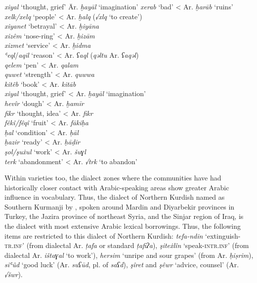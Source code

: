 \documentclass[output=paper]{langsci/langscibook}
\begin{document}
\ea
\begin{tabbing}
\textit{xiyal} ‘thought, grief’ \hspace{1em} \= Ar. \textit{ḫayāl} ‘imagination’\kill
\textit{xerab} ‘bad’     \> < Ar. \textit{ḫarāb} ‘ruins’\\
\textit{xelk/xelq} ‘people’  \> < Ar. \textit{ḫalq} (\textit{√xlq} ‘to create’)\\
\textit{xiyanet} ‘betrayal’  \> < Ar. \textit{ḫiyāna} \\
\textit{xizêm} ‘nose-ring’  \> < Ar. \textit{ḫizām}\\
\textit{xizmet} ‘service’  \> < Ar. \textit{ḫidma} \\
\textit{ʿeql}/\textit{aqil} ‘reason’  \> < Ar. \textit{ʕaql} (\textit{qəltu} Ar. \textit{ʕaqəl})\\
\textit{qelem} ‘pen’    \> < Ar. \textit{qalam}\\
\textit{quwet} ‘strength’  \> < Ar. \textit{quwwa}\\
\textit{kitêb} ‘book’    \> < Ar. \textit{kitāb}\\
\textit{xiyal} ‘thought, grief’  \> < Ar. \textit{ḫayāl} ‘imagination’\\
\textit{hevîr} ‘dough’    \> < Ar. \textit{ḫamīr} \\
\textit{fikr} ‘thought, idea’  \> < Ar. \textit{fikr}\\
\textit{fêkî/fêqî} ‘fruit’  \> < Ar. \textit{fākiḥa}\\
\textit{ḥal} ‘condition’  \> < Ar. \textit{ḥāl} \\
\textit{ḥazir} ‘ready’    \> < Ar. \textit{ḥāḍir}\\
\textit{şol/şuẋul} ‘work’  \> < Ar. \textit{šuɣl} \\
\textit{terk} ‘abandonment’  \> < Ar. \textit{√trk} ‘to abandon’
\end{tabbing}
\z

Within varieties too, the dialect zones where the communities have had historically closer contact with Arabic-speaking areas show greater Arabic influence in vocabulary. Thus, the dialect of Northern Kurdish named as Southern Kurmanji by  \citet{ÖpenginHaig2014}, spoken around Mardin and Diyarbekir provinces in Turkey, the Jazira province of northeast Syria, and the Sinjar region of Iraq, is the dialect with most extensive Arabic lexical borrowings. Thus, the following items are restricted to this dialect of Northern Kurdish: \textit{tefa-ndin} ‘extinguish-\textsc{tr.inf}’ (from dialectal Ar. \textit{ṭafa} or standard \textit{ṭafiʔa}), \textit{şiteẋlîn} ‘speak-\textsc{intr.inf}’ (from dialectal Ar. \textit{ištaɣal} ‘to work’), \textit{hersim} ‘unripe and sour grapes’ (from Ar. \textit{ḥiṣrim}), \textit{siʿûd} ‘good luck’ (Ar. \textit{suʕūd}, pl. of \textit{saʕd}), \textit{şîret} and \textit{şêwr} ‘advice, counsel’ (Ar. \textit{√šwr}).     
\end{document}
